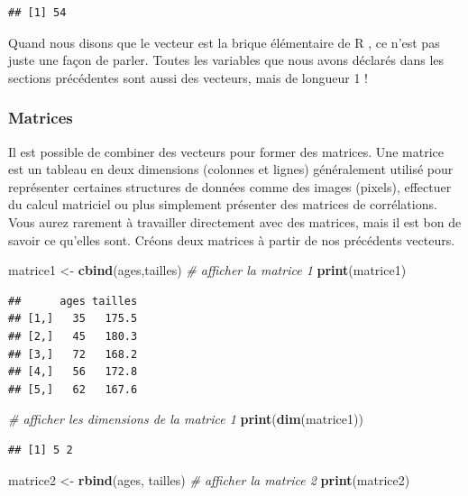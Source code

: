 \documentclass[
  11pt,
  french,
]{book}
\makeatletter
\newenvironment{Shaded}{\begin{snugshade}}{\end{snugshade}}
\newcommand{\CommentTok}[1]{\textcolor[rgb]{0.56,0.35,0.01}{\textit{#1}}}
\newcommand{\KeywordTok}[1]{\textcolor[rgb]{0.13,0.29,0.53}{\textbf{#1}}}
\newcommand{\NormalTok}[1]{#1}
\newcommand{\StringTok}[1]{\textcolor[rgb]{0.31,0.60,0.02}{#1}}
\newenvironment{kframe}{%
\medskip{}
\setlength{\fboxsep}{.8em}
 \def\at@end@of@kframe{}%
 \ifinner\ifhmode%
  \def\at@end@of@kframe{\end{minipage}}%
  \begin{minipage}{\columnwidth}%
 \fi\fi%
 \def\FrameCommand##1{\hskip\@totalleftmargin \hskip-\fboxsep
 \colorbox{shadecolor}{##1}\hskip-\fboxsep
     \hskip-\linewidth \hskip-\@totalleftmargin \hskip\columnwidth}%
 \MakeFramed {\advance\hsize-\width
   \@totalleftmargin\z@ \linewidth\hsize
   \@setminipage}}%
 {\par\unskip\endMakeFramed%
 \at@end@of@kframe}
\renewenvironment{Shaded}{\begin{kframe}}{\end{kframe}}
\makeatother
\begin{document}
\begin{verbatim}
## [1] 54
\end{verbatim}

Quand nous disons que le vecteur est la brique élémentaire de R , ce n'est pas juste une façon de parler. Toutes les variables que nous avons déclarés dans les sections précédentes sont aussi des vecteurs, mais de longueur 1 !

\hypertarget{sect01362}{%
\subsubsection{Matrices}\label{sect01362}}

Il est possible de combiner des vecteurs pour former des matrices. Une matrice est un tableau en deux dimensions (colonnes et lignes) généralement utilisé pour représenter certaines structures de données comme des images (pixels), effectuer du calcul matriciel ou plus simplement présenter des matrices de corrélations. Vous aurez rarement à travailler directement avec des matrices, mais il est bon de savoir ce qu'elles sont. Créons deux matrices à partir de nos précédents vecteurs.

\begin{Shaded}
\begin{Highlighting}[]
\NormalTok{matrice1 <-}\StringTok{ }\KeywordTok{cbind}\NormalTok{(ages,tailles)}
\CommentTok{# afficher la matrice 1}
\KeywordTok{print}\NormalTok{(matrice1)}
\end{Highlighting}
\end{Shaded}

\begin{verbatim}
##      ages tailles
## [1,]   35   175.5
## [2,]   45   180.3
## [3,]   72   168.2
## [4,]   56   172.8
## [5,]   62   167.6
\end{verbatim}

\begin{Shaded}
\begin{Highlighting}[]
\CommentTok{# afficher les dimensions de la matrice 1}
\KeywordTok{print}\NormalTok{(}\KeywordTok{dim}\NormalTok{(matrice1))}
\end{Highlighting}
\end{Shaded}

\begin{verbatim}
## [1] 5 2
\end{verbatim}

\begin{Shaded}
\begin{Highlighting}[]
\NormalTok{matrice2 <-}\StringTok{ }\KeywordTok{rbind}\NormalTok{(ages, tailles)}
\CommentTok{# afficher la matrice 2}
\KeywordTok{print}\NormalTok{(matrice2)}
\end{Highlighting}
\end{Shaded}
\end{document}
